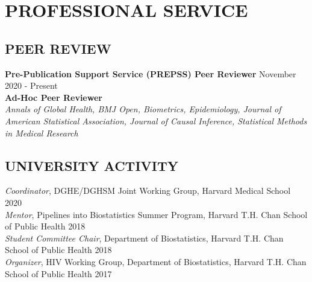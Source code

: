 \documentclass[12pt]{article}
\begin{document}
%

\section*{\textbf{{\large P}{ROFESSIONAL} {\large S}{ERVICE}}}


\subsection*{\textbf{PEER REVIEW}}

\textbf{Pre-Publication Support Service (PREPSS) Peer Reviewer} \hfill \hfill November 2020 - Present\\

\textbf{Ad-Hoc Peer Reviewer} \\
\textit{Annals of Global Health, BMJ Open, Biometrics, Epidemiology, Journal of American Statistical Association, Journal of Causal Inference, Statistical Methods in Medical Research}

\subsection*{\textbf{UNIVERSITY ACTIVITY}}
\textit{Coordinator}, DGHE/DGHSM Joint Working Group, Harvard Medical School \hfill \hfill 2020 \\
\textit{Mentor}, Pipelines into Biostatistics Summer Program, Harvard T.H. Chan School of
Public Health \hfill \hfill 2018 \\
\textit{Student Committee Chair}, Department of Biostatistics, Harvard T.H. Chan School of
Public Health \hfill \hfill 2018 \\
\textit{Organizer}, HIV Working Group, Department of Biostatistics, Harvard T.H. Chan School of
Public Health \hfill \hfill 2017 
\end{document}
